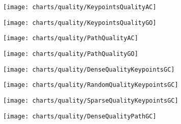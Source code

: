     \newpage
    \begin{figure}[!ht]
      \centering
      \texttt{[image: charts/quality/KeypointsQualityAC]}
      \caption[]
              {}
      \label{fig:KeypointsQualityAC}
    \end{figure}

    \begin{figure}[!ht]
      \centering
      \texttt{[image: charts/quality/KeypointsQualityGO]}
      \caption[]
              {}
      \label{fig:KeypointsQualityGO}
    \end{figure}

    \newpage
    \begin{figure}[!ht]
      \centering
      \texttt{[image: charts/quality/PathQualityAC]}
      \caption[]
              {}
      \label{fig:PathQualityAC}
    \end{figure}

    \begin{figure}[!ht]
      \centering
      \texttt{[image: charts/quality/PathQualityGO]}
      \caption[]
              {}
      \label{fig:PathQualityGO}
    \end{figure}

    \newpage
    \begin{figure}[!ht]
      \centering
      \texttt{[image: charts/quality/DenseQualityKeypointsGC]}
      \caption[]
              {}
      \label{fig:DenseQualityKeypointsGC}
    \end{figure}

    \begin{figure}[!ht]
      \centering
      \texttt{[image: charts/quality/RandomQualityKeypointsGC]}
      \caption[]
              {}
      \label{fig:RandomQualityKeypointsGC}
    \end{figure}

    \begin{figure}[!ht]
      \centering
      \texttt{[image: charts/quality/SparseQualityKeypointsGC]}
      \caption[]
              {}
      \label{fig:SparseQualityKeypointsGC}
    \end{figure}

    \newpage
    \begin{figure}[!ht]
      \centering
      \texttt{[image: charts/quality/DenseQualityPathGC]}
      \caption[]
              {}
      \label{fig:DenseQualityPathGC}
    \end{figure}

